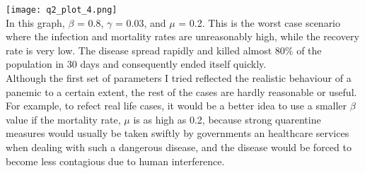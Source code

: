 \documentclass{article}
\begin{document}
\texttt{[image: q2\_plot\_4.png]}
 \\
In this graph, $\beta$ = 0.8, $\gamma$ = 0.03, and $\mu$ = 0.2. This is the worst case scenario where the infection and mortality rates are unreasonably high, while the recovery rate is very low. The disease spread rapidly and killed almost 80\% of the population in 30 days and consequently ended itself quickly.
 \\
Although the first set of parameters I tried reflected the realistic behaviour of a panemic to a certain extent, the rest of the cases are hardly reasonable or useful. For example, to refect real life cases, it would be a better idea to use a smaller $\beta$ value if the mortality rate, $\mu$ is as high as 0.2, because strong quarentine measures would usually be taken swiftly by governments an healthcare services when dealing with such a dangerous disease, and the disease would be forced to become less contagious due to human interference. 
\end{document}
